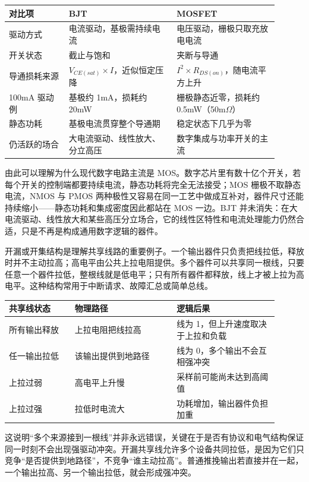 \begin{longtable}{L{0.2\linewidth}L{0.36\linewidth}L{0.34\linewidth}}
\toprule
对比项 & BJT & MOSFET \\
\midrule
驱动方式 & 电流驱动，基极需持续电流 & 电压驱动，栅极只取充放电电流 \\\tablerowrule
开关状态 & 截止与饱和 & 夹断与导通 \\\tablerowrule
导通损耗来源 & $V_{CE(sat)} \times I$，近似恒定压降 & $I^2 \times R_{DS(on)}$，随电流平方上升 \\\tablerowrule
100mA 驱动例 & 基极约 1mA，损耗约 20mW & 栅极静态近零，损耗约 0.5mW（50m$\Omega$） \\\tablerowrule
静态功耗 & 基极电流贯穿整个导通期 & 稳定状态下几乎为零 \\\tablerowrule
仍活跃的场合 & 大电流驱动、线性放大、分立高压 & 数字集成与功率开关的主流 \\
\bottomrule
\end{longtable}

由此可以理解为什么现代数字电路主流是 MOS。数字芯片里有数十亿个开关，若每个开关的控制端都要持续电流，静态功耗将完全无法接受；MOS 栅极不取静态电流，NMOS 与 PMOS 两种极性又容易在同一工艺中做成互补对，器件尺寸还能持续缩小——静态功耗和集成密度因此都站在 MOS 一边。BJT 并未消失：在大电流驱动、线性放大和某些高压分立场合，它的线性区特性和电流处理能力仍然合适，只是不再是构成通用数字逻辑的器件。

开漏或开集结构是理解共享线路的重要例子。一个输出器件只负责把线拉低，释放时并不主动拉高；高电平由公共上拉电阻提供。多个器件可以共享同一根线，只要任意一个器件拉低，整根线就是低电平；只有所有器件都释放，线上才被上拉为高电平。这种结构常用于中断请求、故障汇总或简单总线。

\begin{longtable}{L{0.22\linewidth}L{0.34\linewidth}L{0.34\linewidth}}
\toprule
共享线状态 & 物理路径 & 逻辑后果 \\
\midrule
所有输出释放 & 上拉电阻把线拉高 & 线为 1，但上升速度取决于上拉和负载 \\\tablerowrule
任一输出拉低 & 该输出提供到地路径 & 线为 0，多个输出不会互相强冲突 \\\tablerowrule
上拉过弱 & 高电平上升慢 & 采样前可能尚未达到高阈值 \\\tablerowrule
上拉过强 & 拉低时电流大 & 功耗增加，输出器件负担加重 \\
\bottomrule
\end{longtable}

这说明“多个来源接到一根线”并非永远错误，关键在于是否有协议和电气结构保证同一时刻不会出现强驱动冲突。开漏共享线允许多个设备共同拉低，是因为它们只竞争“是否提供到地路径”，不竞争“谁主动拉高”。普通推挽输出若直接并在一起，一个输出拉高、另一个输出拉低，就会形成强冲突。

